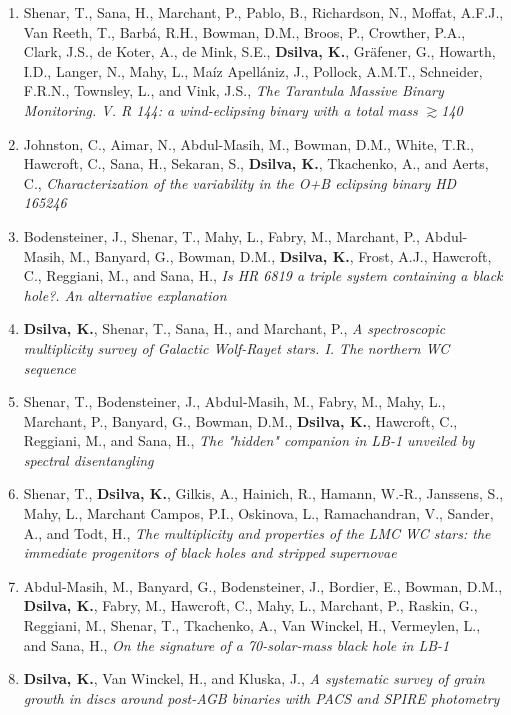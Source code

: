 \begin{enumerate}
\item Shenar, T., Sana, H., Marchant, P., Pablo, B., Richardson, N., Moffat, A.F.J., Van Reeth, T., Barbá, R.H., Bowman, D.M., Broos, P., Crowther, P.A., Clark, J.S., de Koter, A., de Mink, S.E., \textbf{Dsilva, K.}, Gräfener, G., Howarth, I.D., Langer, N., Mahy, L., Maíz Apellániz, J., Pollock, A.M.T., Schneider, F.R.N., Townsley, L., and Vink, J.S., \textit{The Tarantula Massive Binary Monitoring. V. R 144: a wind-eclipsing binary with a total mass $\gtrsim$140\,\Msun{}}

\item Johnston, C., Aimar, N., Abdul-Masih, M., Bowman, D.M., White, T.R., Hawcroft, C., Sana, H., Sekaran, S., \textbf{Dsilva, K.}, Tkachenko, A., and Aerts, C., \textit{Characterization of the variability in the O+B eclipsing binary HD 165246}

\item Bodensteiner, J., Shenar, T., Mahy, L., Fabry, M., Marchant, P., Abdul-Masih, M., Banyard, G., Bowman, D.M., \textbf{Dsilva, K.}, Frost, A.J., Hawcroft, C., Reggiani, M., and Sana, H., \textit{Is HR 6819 a triple system containing a black hole?. An alternative explanation}

\item \textbf{Dsilva, K.}, Shenar, T., Sana, H., and Marchant, P., \textit{A spectroscopic multiplicity survey of Galactic Wolf-Rayet stars. I. The northern WC sequence}

\item Shenar, T., Bodensteiner, J., Abdul-Masih, M., Fabry, M., Mahy, L., Marchant, P., Banyard, G., Bowman, D.M., \textbf{Dsilva, K.}, Hawcroft, C., Reggiani, M., and Sana, H., \textit{The "hidden" companion in LB-1 unveiled by spectral disentangling}

\item Shenar, T., \textbf{Dsilva, K.}, Gilkis, A., Hainich, R., Hamann, W.-R., Janssens, S., Mahy, L., Marchant Campos, P.I., Oskinova, L., Ramachandran, V., Sander, A., and Todt, H., \textit{The multiplicity and properties of the LMC WC stars: the immediate progenitors of black holes and stripped supernovae}

\item Abdul-Masih, M., Banyard, G., Bodensteiner, J., Bordier, E., Bowman, D.M., \textbf{Dsilva, K.}, Fabry, M., Hawcroft, C., Mahy, L., Marchant, P., Raskin, G., Reggiani, M., Shenar, T., Tkachenko, A., Van Winckel, H., Vermeylen, L., and Sana, H., \textit{On the signature of a 70-solar-mass black hole in LB-1}

\item \textbf{Dsilva, K.}, Van Winckel, H., and Kluska, J., \textit{A systematic survey of grain growth in discs around post-AGB binaries with PACS and SPIRE photometry}



\end{enumerate}



\cleardoublepage

